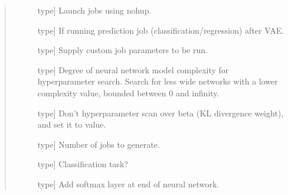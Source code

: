 \documentclass[letterpaper,10pt,english]{sphinxmanual}
\begin{document}
\begin{fulllineitems}
\begin{quote}
\begin{description}
\begin{description}
\item[{}] \leavevmode{[}type{]}
Launch jobs using nohup.

\item[{}] \leavevmode{[}type{]}
If running prediction job (classification/regression) after VAE.

\item[{}] \leavevmode{[}type{]}
Supply custom job parameters to be run.

\item[{}] \leavevmode{[}type{]}
Degree of neural network model complexity for hyperparameter search. Search for less wide networks with a lower complexity value, bounded between 0 and infinity.

\item[{}] \leavevmode{[}type{]}
Don’t hyperparameter scan over beta (KL divergence weight), and set it to value.

\item[{}] \leavevmode{[}type{]}
Number of jobs to generate.

\item[{}] \leavevmode{[}type{]}
Classification task?

\item[{}] \leavevmode{[}type{]}
Add softmax layer at end of neural network.

\end{description}

\end{description}\end{quote}

\end{fulllineitems}

\end{document}
